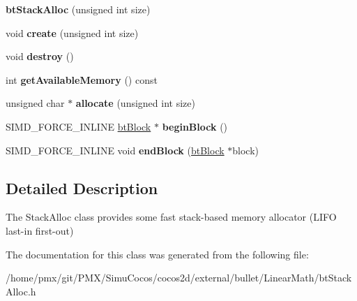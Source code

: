\begin{DoxyCompactItemize}
\item 
\mbox{\label{classbtStackAlloc_aa1f1da74e2983e8f5e3b41228caf3e8d}} 
{\bfseries bt\+Stack\+Alloc} (unsigned int size)
\item 
\mbox{\label{classbtStackAlloc_a7458509926cd6c3e30ce01b8b46741aa}} 
void {\bfseries create} (unsigned int size)
\item 
\mbox{\label{classbtStackAlloc_a1d8b2c69a0f38538adbe8f6193d38218}} 
void {\bfseries destroy} ()
\item 
\mbox{\label{classbtStackAlloc_aac6cc5c5bd9f5b9042829283030e0421}} 
int {\bfseries get\+Available\+Memory} () const
\item 
\mbox{\label{classbtStackAlloc_a88484bf546396b0832589913dedcfe67}} 
unsigned char $\ast$ {\bfseries allocate} (unsigned int size)
\item 
\mbox{\label{classbtStackAlloc_ae8e4baf11b0efda337b30e4c79ae354f}} 
S\+I\+M\+D\+\_\+\+F\+O\+R\+C\+E\+\_\+\+I\+N\+L\+I\+NE \hyperlink{structbtBlock}{bt\+Block} $\ast$ {\bfseries begin\+Block} ()
\item 
\mbox{\label{classbtStackAlloc_a684a3696b6ac56a6316b7e4f6b64c3a3}} 
S\+I\+M\+D\+\_\+\+F\+O\+R\+C\+E\+\_\+\+I\+N\+L\+I\+NE void {\bfseries end\+Block} (\hyperlink{structbtBlock}{bt\+Block} $\ast$block)
\end{DoxyCompactItemize}


\subsection{Detailed Description}
The Stack\+Alloc class provides some fast stack-\/based memory allocator (L\+I\+FO last-\/in first-\/out) 

The documentation for this class was generated from the following file\+:\begin{DoxyCompactItemize}
\item 
/home/pmx/git/\+P\+M\+X/\+Simu\+Cocos/cocos2d/external/bullet/\+Linear\+Math/bt\+Stack\+Alloc.\+h\end{DoxyCompactItemize}
